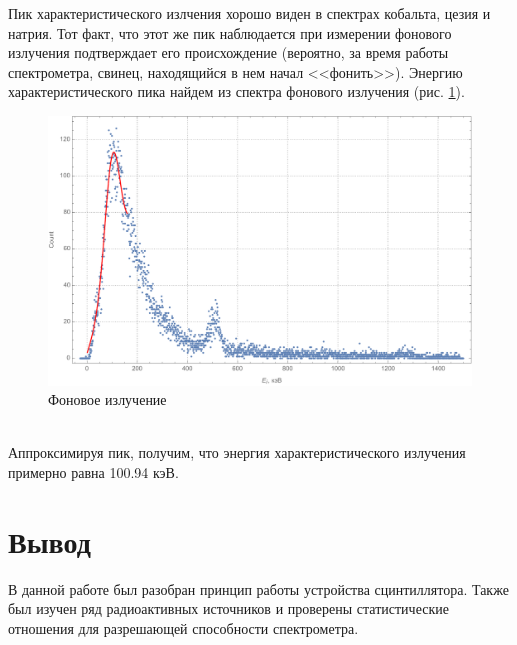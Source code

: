 \documentclass[a4paper, 12pt]{article}
\begin{document}
Пик характеристического излчения хорошо виден в спектрах кобальта, цезия и натрия. Тот факт, что этот же пик наблюдается при измерении фонового излучения подтверждает его происхождение (вероятно, за время работы спектрометра, свинец, находящийся в нем начал <<фонить>>). Энергию характеристического пика найдем из спектра фонового излучения (рис. \ref{fig:background}).
\begin{figure}[!htb]
\centering
\includegraphics[scale=0.6]{backgroundPb.pdf}
\caption{Фоновое излучение}
\label{fig:background}
\end{figure}
\\
Аппроксимируя пик, получим, что энергия характеристического излучения примерно равна 100.94 кэВ.
\section{Вывод}
В данной работе был разобран принцип работы устройства сцинтиллятора. Также был изучен ряд радиоактивных источников и проверены статистические отношения для разрешающей способности спектрометра.
\end{document}
